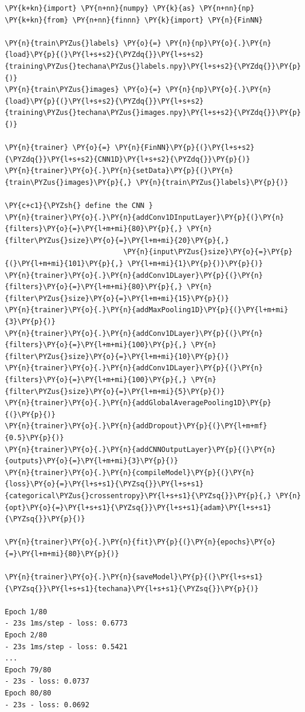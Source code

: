 \begin{codebox}[breakable, size=fbox, boxrule=1pt, pad at break*=1mm,colback=cellbackground, colframe=cellborder]
\begin{Verbatim}[commandchars=\\\{\}]
\PY{k+kn}{import} \PY{n+nn}{numpy} \PY{k}{as} \PY{n+nn}{np}
\PY{k+kn}{from} \PY{n+nn}{finnn} \PY{k}{import} \PY{n}{FinNN}
	
\PY{n}{train\PYZus{}labels} \PY{o}{=} \PY{n}{np}\PY{o}{.}\PY{n}{load}\PY{p}{(}\PY{l+s+s2}{\PYZdq{}}\PY{l+s+s2}{training\PYZus{}techana\PYZus{}labels.npy}\PY{l+s+s2}{\PYZdq{}}\PY{p}{)}
\PY{n}{train\PYZus{}images} \PY{o}{=} \PY{n}{np}\PY{o}{.}\PY{n}{load}\PY{p}{(}\PY{l+s+s2}{\PYZdq{}}\PY{l+s+s2}{training\PYZus{}techana\PYZus{}images.npy}\PY{l+s+s2}{\PYZdq{}}\PY{p}{)}
	
\PY{n}{trainer} \PY{o}{=} \PY{n}{FinNN}\PY{p}{(}\PY{l+s+s2}{\PYZdq{}}\PY{l+s+s2}{CNN1D}\PY{l+s+s2}{\PYZdq{}}\PY{p}{)}
\PY{n}{trainer}\PY{o}{.}\PY{n}{setData}\PY{p}{(}\PY{n}{train\PYZus{}images}\PY{p}{,} \PY{n}{train\PYZus{}labels}\PY{p}{)}
	
\PY{c+c1}{\PYZsh{} define the CNN }
\PY{n}{trainer}\PY{o}{.}\PY{n}{addConv1DInputLayer}\PY{p}{(}\PY{n}{filters}\PY{o}{=}\PY{l+m+mi}{80}\PY{p}{,} \PY{n}{filter\PYZus{}size}\PY{o}{=}\PY{l+m+mi}{20}\PY{p}{,} 
                            \PY{n}{input\PYZus{}size}\PY{o}{=}\PY{p}{(}\PY{l+m+mi}{101}\PY{p}{,} \PY{l+m+mi}{1}\PY{p}{)}\PY{p}{)}
\PY{n}{trainer}\PY{o}{.}\PY{n}{addConv1DLayer}\PY{p}{(}\PY{n}{filters}\PY{o}{=}\PY{l+m+mi}{80}\PY{p}{,} \PY{n}{filter\PYZus{}size}\PY{o}{=}\PY{l+m+mi}{15}\PY{p}{)}
\PY{n}{trainer}\PY{o}{.}\PY{n}{addMaxPooling1D}\PY{p}{(}\PY{l+m+mi}{3}\PY{p}{)}
\PY{n}{trainer}\PY{o}{.}\PY{n}{addConv1DLayer}\PY{p}{(}\PY{n}{filters}\PY{o}{=}\PY{l+m+mi}{100}\PY{p}{,} \PY{n}{filter\PYZus{}size}\PY{o}{=}\PY{l+m+mi}{10}\PY{p}{)}
\PY{n}{trainer}\PY{o}{.}\PY{n}{addConv1DLayer}\PY{p}{(}\PY{n}{filters}\PY{o}{=}\PY{l+m+mi}{100}\PY{p}{,} \PY{n}{filter\PYZus{}size}\PY{o}{=}\PY{l+m+mi}{5}\PY{p}{)}
\PY{n}{trainer}\PY{o}{.}\PY{n}{addGlobalAveragePooling1D}\PY{p}{(}\PY{p}{)}
\PY{n}{trainer}\PY{o}{.}\PY{n}{addDropout}\PY{p}{(}\PY{l+m+mf}{0.5}\PY{p}{)}
\PY{n}{trainer}\PY{o}{.}\PY{n}{addCNNOutputLayer}\PY{p}{(}\PY{n}{outputs}\PY{o}{=}\PY{l+m+mi}{3}\PY{p}{)}
\PY{n}{trainer}\PY{o}{.}\PY{n}{compileModel}\PY{p}{(}\PY{n}{loss}\PY{o}{=}\PY{l+s+s1}{\PYZsq{}}\PY{l+s+s1}{categorical\PYZus{}crossentropy}\PY{l+s+s1}{\PYZsq{}}\PY{p}{,} \PY{n}{opt}\PY{o}{=}\PY{l+s+s1}{\PYZsq{}}\PY{l+s+s1}{adam}\PY{l+s+s1}{\PYZsq{}}\PY{p}{)}
	
\PY{n}{trainer}\PY{o}{.}\PY{n}{fit}\PY{p}{(}\PY{n}{epochs}\PY{o}{=}\PY{l+m+mi}{80}\PY{p}{)}
	
\PY{n}{trainer}\PY{o}{.}\PY{n}{saveModel}\PY{p}{(}\PY{l+s+s1}{\PYZsq{}}\PY{l+s+s1}{techana}\PY{l+s+s1}{\PYZsq{}}\PY{p}{)}

Epoch 1/80
- 23s 1ms/step - loss: 0.6773
Epoch 2/80
- 23s 1ms/step - loss: 0.5421
...
Epoch 79/80
- 23s - loss: 0.0737
Epoch 80/80
- 23s - loss: 0.0692
\end{Verbatim}
\end{codebox}

